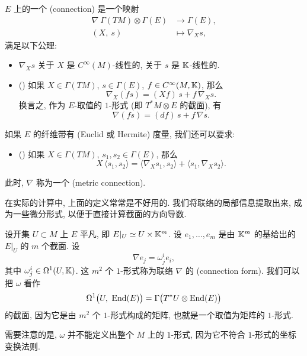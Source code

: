 \begin{definition}
    $E$ 上的一个 (connection) 是一个映射
    \[ \begin{aligned}
        \nabla \: \Gamma (TM) \otimes \Gamma (E) &\to \Gamma (E), \\
        (X, \ s) &\mapsto \nabla_X s, 
    \end{aligned} \]
    满足以下公理:
    \begin{itemize}
        \item
            $\nabla_X s$ 关于 $X$ 是 $C^\infty (M)$-线性的,
            关于 $s$ 是 $\mathbb{K}$-线性的.
        \item ()
            如果 $X \in \Gamma (TM)$, $s \in \Gamma (E)$, $f \in C^\infty (M, \mathbb{K})$, 那么
            \[ \nabla_X (fs) = (Xf) \, s + f \, \nabla_X s. \]
            换言之, 作为 $E$-取值的 $1$-形式 (即 $T^* M \otimes E$ 的截面), 有
            \[ \nabla (fs) = (df) \, s + f \, \nabla s. \]
    \end{itemize}
    如果 $E$ 的纤维带有 (Euclid 或 Hermite) 度量, 我们还可以要求:
    \begin{itemize}
        \item ()
            如果 $X \in \Gamma (TM)$, $s_1, s_2 \in \Gamma (E)$, 那么
            \[ X \, \langle s_1, s_2 \rangle =
                \langle \nabla_X s_1, s_2 \rangle + \langle s_1, \nabla_X s_2 \rangle. \]
    \end{itemize}
    此时, $\nabla$ 称为一个 (metric connection).
\end{definition}

在实际的计算中, 上面的定义常常是不好用的.
我们将联络的局部信息提取出来, 成为一些微分形式, 以便于直接计算截面的方向导数.

\begin{definition}
    设开集 $U \subset M$ 上 $E$ 平凡, 即 $E |_U \simeq U \times \mathbb{K}^m$.
    设 $e_1, \dotsc, e_m$ 是由 $\mathbb{K}^m$ 的基给出的 $E |_U$ 的 $m$ 个截面. 设
    \[ \nabla e_j = \omega_j^i e_i, \]
    其中 $\omega_j^i \in \Omega^1 (U, \mathbb{K})$.
    这 $m^2$ 个 $1$-形式称为联络 $\nabla$ 的 (connection form).
    我们可以把 $\omega$ 看作
    \[ \Omega^1 \bigl( U, \ \operatorname{End} (E) \bigr) =
        \Gamma \bigl( T^* U \otimes \operatorname{End} (E) \bigr) \]
    的截面, 因为它是由 $m^2$ 个 $1$-形式构成的矩阵, 也就是一个取值为矩阵的 $1$-形式.
\end{definition}

需要注意的是, $\omega$ 并不能定义出整个 $M$ 上的 $1$-形式,
因为它不符合 $1$-形式的坐标变换法则.

